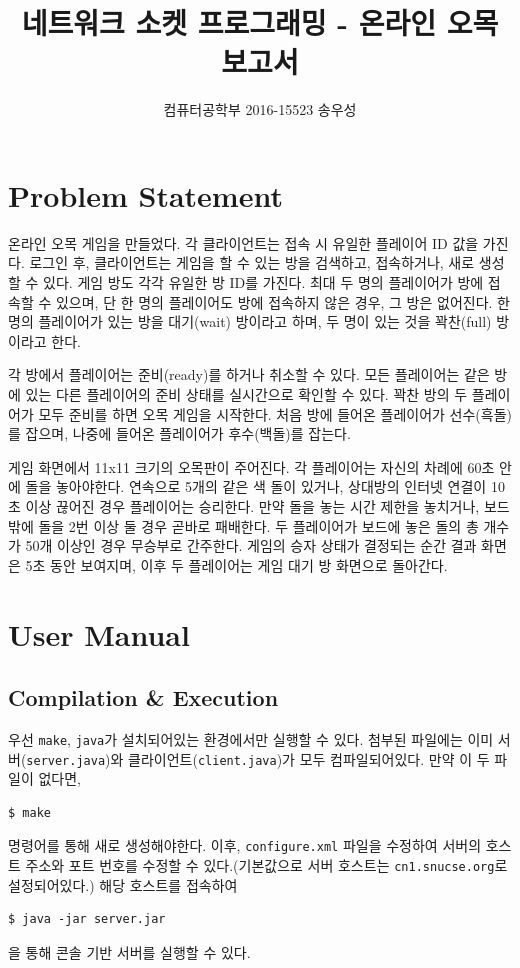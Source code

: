 \documentclass[a4paper, 10pt]{article}
\title{네트워크 소켓 프로그래밍 - 온라인 오목 보고서}
\author{컴퓨터공학부 2016-15523 송우성}
\begin{document}
\maketitle

\section{Problem Statement}
온라인 오목 게임을 만들었다. 각 클라이언트는 접속 시 유일한 플레이어 ID 값을
가진다. 로그인 후, 클라이언트는 게임을 할 수 있는 방을 검색하고, 접속하거나, 새로
생성할 수 있다. 게임 방도 각각 유일한 방 ID를 가진다. 최대 두 명의 플레이어가 방에 접속할
수 있으며, 단 한 명의 플레이어도 방에 접속하지 않은 경우, 그 방은 없어진다. 한
명의 플레이어가 있는 방을 대기(wait) 방이라고 하며, 두 명이 있는 것을 꽉찬(full)
방이라고 한다.

각 방에서 플레이어는 준비(ready)를 하거나 취소할 수 있다. 모든 플레이어는 같은
방에 있는 다른 플레이어의 준비 상태를 실시간으로 확인할 수 있다. 꽉찬 방의 두
플레이어가 모두 준비를 하면 오목 게임을 시작한다. 처음 방에 들어온 플레이어가
선수(흑돌)를 잡으며, 나중에 들어온 플레이어가 후수(백돌)를 잡는다.

게임 화면에서 11x11 크기의 오목판이 주어진다. 각 플레이어는 자신의 차례에
60초 안에 돌을 놓아야한다. 연속으로 5개의 같은 색 돌이 있거나, 상대방의
인터넷 연결이 10초 이상 끊어진 경우 플레이어는 승리한다. 만약 돌을 놓는 시간
제한을 놓치거나, 보드 밖에 돌을 2번 이상 둘 경우 곧바로 패배한다. 두 플레이어가
보드에 놓은 돌의 총 개수가 50개 이상인 경우 무승부로 간주한다. 게임의 승자
상태가 결정되는 순간 결과 화면은 5초 동안 보여지며, 이후 두 플레이어는
게임 대기 방 화면으로 돌아간다.

\section{User Manual}
\subsection{Compilation \& Execution}
우선 \texttt{make}, \texttt{java}가 설치되어있는 환경에서만 실행할 수 있다.
첨부된 파일에는 이미 서버(\texttt{server.java})와 클라이언트(\texttt{client.java})가
모두 컴파일되어있다. 만약 이 두 파일이 없다면,
\begin{Verbatim}[tabsize=4,xleftmargin=2em]
$ make
\end{Verbatim}
명령어를 통해 새로 생성해야한다. 이후, \texttt{configure.xml} 파일을 수정하여
서버의 호스트 주소와 포트 번호를 수정할 수 있다.(기본값으로 서버 호스트는
\texttt{cn1.snucse.org}로 설정되어있다.) 해당 호스트를 접속하여
\begin{Verbatim}[tabsize=4,xleftmargin=2em]
$ java -jar server.jar
\end{Verbatim}
을 통해 콘솔 기반 서버를 실행할 수 있다.
\end{document}
